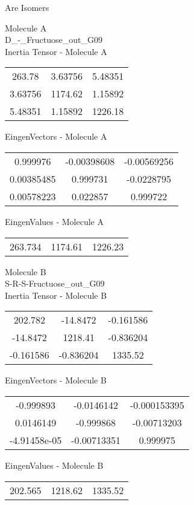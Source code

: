 \begin{center}
\vtab
\vtab
\textcolor{NavyBlue}{\Large Are Isomers}
\end{center}
\newpage
\begin{multicols}{2}
\begin{center}
Molecule A \\ 
D\_-\_Fructuose\_out\_G09
\\
Inertia Tensor - Molecule A \\
\vtab
\begin{tabular}{|c c c|}
263.78	 & 	3.63756	 & 	5.48351	 \\
3.63756	 & 	1174.62	 & 	1.15892	 \\
5.48351	 & 	1.15892	 & 	1226.18
\end{tabular}

\vtab
 EingenVectors - Molecule A     \\
\vtab
\begin{tabular}{|c c c|}
0.999976	 & 	-0.00398608	 & 	-0.00569256	 \\
0.00385485	 & 	0.999731	 & 	-0.0228795	 \\
0.00578223	 & 	0.022857	 & 	0.999722
\end{tabular}

\vtab
 EingenValues - Molecule A     \\
\vtab
\begin{tabular}{|c c c|}
263.734	 & 	1174.61	 & 	1226.23
\end{tabular}
\columnbreak

Molecule B \\ 
S-R-S-Fructuose\_out\_G09
\\
Inertia Tensor - Molecule B \\
\vtab
\begin{tabular}{|c c c|}
202.782	 & 	-14.8472	 & 	-0.161586	 \\
-14.8472	 & 	1218.41	 & 	-0.836204	 \\
-0.161586	 & 	-0.836204	 & 	1335.52
\end{tabular}

\vtab
 EingenVectors - Molecule B     \\
\vtab
\begin{tabular}{|c c c|}
-0.999893	 & 	-0.0146142	 & 	-0.000153395	 \\
0.0146149	 & 	-0.999868	 & 	-0.00713203	 \\
-4.91458e-05	 & 	-0.00713351	 & 	0.999975
\end{tabular}

\vtab
 EingenValues - Molecule B     \\
\vtab
\begin{tabular}{|c c c|}
202.565	 & 	1218.62	 & 	1335.52
\end{tabular}

\end{center}
\end{multicols}
